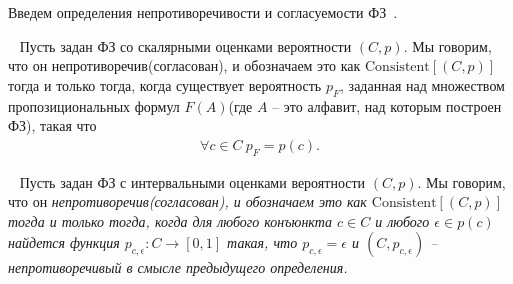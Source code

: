             Введем определения непротиворечивости и согласуемости ФЗ~\cite{AVS_2011}.
            
               
            \begin{Def}
            ~\cite{AVS_2011}
                 Пусть задан ФЗ со скалярными оценками вероятности \begin{math}(C,p)\end{math}. Мы говорим, что он непротиворечив(согласован), и обозначаем это как \begin{math}\mathrm{Consistent}[(C,p)]\end{math} тогда и только тогда, когда существует вероятность \begin{math}p_{F}\end{math}, заданная над множеством пропозициональных формул \begin{math}F(A)\end{math}(где \begin{math}A\end{math} -- это алфавит, над которым построен ФЗ), такая что 
                \begin{eqnarray*}
                    \forall c\in C \:  p_{F} = p(c).
                \end{eqnarray*}
            \end{Def}
          
            \begin{Def}
            ~\cite{AVS_2011}
                Пусть задан ФЗ с интервальными оценками вероятности \begin{math}(C,p)\end{math}. Мы говорим, что он \it{непротиворечив}(согласован), и обозначаем это как \begin{math}\mathrm{Consistent}[(C,p)]\end{math} тогда и только тогда, когда для любого конъюнкта \begin{math} c \in C \end{math}  и любого \begin{math} \epsilon \in p(c) \end{math} найдется функция \begin{math} p_{c,\epsilon} : C \to [0,1] \end{math}  такая, что \begin{math} p_{c,\epsilon} = \epsilon \end{math} и \begin{math} (C, p_{c,\epsilon}) \end{math} -- непротиворечивый в смысле предыдущего определения.
            \end{Def}
            
